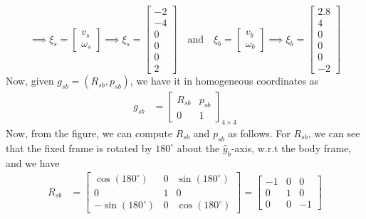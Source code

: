 \begin{equation*}
    \implies
    \xi_{s}
    =
    \begin{bmatrix}
        v_{s} \\
        \omega_{s}
    \end{bmatrix}
    \implies
    \boxed{
        \xi_{s}
        =
        \begin{bmatrix}
            -2 \\
            -4 \\
            0  \\
            0  \\
            0  \\
            2
        \end{bmatrix}
    }
    \quad \text{and} \quad
    \xi_{b}
    =
    \begin{bmatrix}
        v_{b} \\
        \omega_{b}
    \end{bmatrix}
    \implies
    \boxed{
        \xi_{b}
        =
        \begin{bmatrix}
            2.8 \\
            4   \\
            0   \\
            0   \\
            0   \\
            -2
        \end{bmatrix}
    }
\end{equation*}
Now, given \( g_{s b} = (R_{s b}, p_{s b}) \), we have it in homogeneous coordinates as
\begin{align*}
    g_{s b}
     & =
    \begin{bmatrix}
        R_{s b} & p_{s b} \\
        0       & 1
    \end{bmatrix}_{4 \times 4}
\end{align*}
Now, from the figure, we can compute \( R_{s b} \) and \( p_{s b} \) as follows.
For \( R_{s b} \), we can see that the fixed frame is rotated by \( 180^{\circ} \) about the \( \hat{y}_{b} \)-axis, w.r.t the body frame, and we have
\begin{align*}
    R_{s b}
     & =
    \begin{bmatrix}
        \cos(180^{\circ})  & 0 & \sin(180^{\circ}) \\
        0                  & 1 & 0                 \\
        -\sin(180^{\circ}) & 0 & \cos(180^{\circ})
    \end{bmatrix}
    =
    \begin{bmatrix}
        -1 & 0 & 0  \\
        0  & 1 & 0  \\
        0  & 0 & -1
    \end{bmatrix}
\end{align*}
